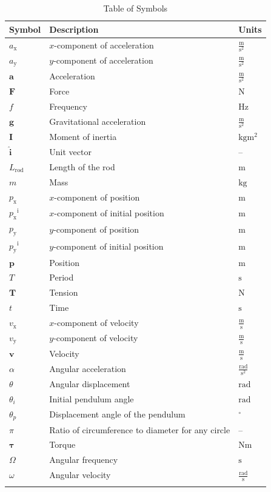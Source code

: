 \documentclass[12pt]{article}
\begin{document}
\begin{longtable}{l l l}
\toprule
\textbf{Symbol} & \textbf{Description} & \textbf{Units}
\\
\midrule
\endhead
${a_{\text{x}}}$ & $x$-component of acceleration & $\frac{\text{m}}{\text{s}^{2}}$
\\
${a_{\text{y}}}$ & $y$-component of acceleration & $\frac{\text{m}}{\text{s}^{2}}$
\\
$\symbf{a}$ & Acceleration & $\frac{\text{m}}{\text{s}^{2}}$
\\
$\symbf{F}$ & Force & ${\text{N}}$
\\
$f$ & Frequency & ${\text{Hz}}$
\\
$\symbf{g}$ & Gravitational acceleration & $\frac{\text{m}}{\text{s}^{2}}$
\\
$\symbf{I}$ & Moment of inertia & $\text{kg}\text{m}^{2}$
\\
$\symbf{\hat{i}}$ & Unit vector & --
\\
${L_{\text{rod}}}$ & Length of the rod & ${\text{m}}$
\\
$m$ & Mass & ${\text{kg}}$
\\
${p_{\text{x}}}$ & $x$-component of position & ${\text{m}}$
\\
${{p_{\text{x}}}^{\text{i}}}$ & $x$-component of initial position & ${\text{m}}$
\\
${p_{\text{y}}}$ & $y$-component of position & ${\text{m}}$
\\
${{p_{\text{y}}}^{\text{i}}}$ & $y$-component of initial position & ${\text{m}}$
\\
$\symbf{p}$ & Position & ${\text{m}}$
\\
$T$ & Period & ${\text{s}}$
\\
$\symbf{T}$ & Tension & ${\text{N}}$
\\
$t$ & Time & ${\text{s}}$
\\
${v_{\text{x}}}$ & $x$-component of velocity & $\frac{\text{m}}{\text{s}}$
\\
${v_{\text{y}}}$ & $y$-component of velocity & $\frac{\text{m}}{\text{s}}$
\\
$\symbf{v}$ & Velocity & $\frac{\text{m}}{\text{s}}$
\\
$α$ & Angular acceleration & $\frac{\text{rad}}{\text{s}^{2}}$
\\
$θ$ & Angular displacement & ${\text{rad}}$
\\
${θ_{i}}$ & Initial pendulum angle & ${\text{rad}}$
\\
${θ_{p}}$ & Displacement angle of the pendulum & ${{}^{\circ}}$
\\
$π$ & Ratio of circumference to diameter for any circle & --
\\
$\symbf{τ}$ & Torque & $\text{N}\text{m}$
\\
$Ω$ & Angular frequency & ${\text{s}}$
\\
$ω$ & Angular velocity & $\frac{\text{rad}}{\text{s}}$
\\
\bottomrule
\caption{Table of Symbols}
\label{Table:ToS}
\end{longtable}
\end{document}
